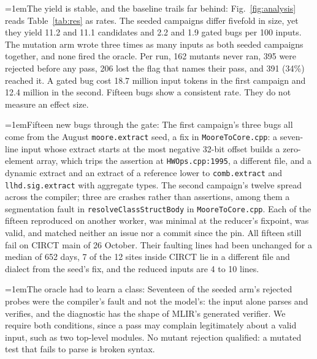 \documentclass[conference]{IEEEtran}
\newcommand{\pointhead}[1]{\par\noindent\hangindent=1em\hangafter=1\makebox[1em][l]{\textbullet}#1:}
\begin{document}
\pointhead{The yield is stable, and the baseline trails far behind}
Fig.~\ref{fig:analysis} reads Table~\ref{tab:res} as rates. The seeded
campaigns differ fivefold in size, yet they yield 11.2 and 11.1 candidates and
2.2 and 1.9 gated bugs per 100 inputs. The mutation arm wrote three times as
many inputs as both seeded campaigns together, and none fired the oracle. Per run, 162 mutants never ran, 395 were rejected
before any pass, 206 lost the flag that names their pass, and 391 (34\%)
reached it. A
gated bug cost 18.7 million input tokens in the first campaign and 12.4 million
in the second. %
Fifteen bugs show a consistent rate. They do not measure an effect size.

\pointhead{Fifteen new bugs through the gate} The first campaign's three bugs all
come from the August \texttt{moore.extract} seed, a fix in
\texttt{MooreToCore.cpp}: a seven-line input whose extract starts at the most
negative 32-bit offset builds a zero-element array, which trips the assertion
at \texttt{HWOps.cpp:1995}, a different file,
and a dynamic extract and an extract of a reference lower to
\texttt{comb.extract} and \texttt{llhd.sig.extract} with aggregate types. %
The second campaign's twelve spread across the compiler; three are crashes
rather than assertions, among them a segmentation fault in
\texttt{resolveClassStructBody} in \texttt{MooreToCore.cpp}. %
Each of the fifteen reproduced on another worker, was minimal at the reducer's
fixpoint, was valid, and matched neither an issue nor a commit since the pin.
All fifteen still fail on CIRCT main of 26 October. Their faulting lines had
been unchanged for a median of 652 days, 7 of the 12 sites inside CIRCT lie in
a different file and dialect from the seed's fix, and the reduced inputs are 4
to 10 lines.

\pointhead{The oracle had to learn a class} Seventeen of the seeded arm's
rejected probes were the compiler's fault and not the model's: the input alone
parses and verifies, and the diagnostic has the shape of MLIR's generated
verifier. We require both conditions, since a pass may complain legitimately
about a valid input, such as two top-level modules. %
No mutant rejection qualified: a mutated test that fails to parse is broken
syntax. %
\end{document}
